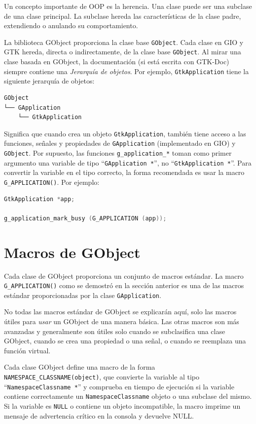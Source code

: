 Un concepto importante de OOP es la herencia. Una clase puede ser una subclase de una clase principal. La subclase hereda las características de la clase padre, extendiendo o anulando su comportamiento.

La biblioteca GObject proporciona la clase base \lstinline{GObject}. Cada clase en GIO y GTK hereda, directa o indirectamente, de la clase base \lstinline{GObject}. Al mirar una clase basada en GObject, la documentación (si está escrita con GTK-Doc) siempre contiene una \emph{Jerarquía de objetos}. Por ejemplo, \lstinline{GtkApplication} tiene la siguiente jerarquía de objetos:

\begin{verbatim}
GObject
└── GApplication
    └── GtkApplication
\end{verbatim}

Significa que cuando crea un objeto \lstinline{GtkApplication}, también tiene acceso a las funciones, señales y propiedades de \lstinline{GApplication} (implementado en GIO) y \lstinline{GObject}. Por supuesto, las funciones \lstinline{g_application_*} toman como primer argumento una variable de tipo ``\lstinline{GApplication *}'', no ``\lstinline{GtkApplication *}''. Para convertir la variable en el tipo correcto, la forma recomendada es usar la macro \lstinline{G_APPLICATION()}. Por ejemplo:

\begin{lstlisting}[language=C]
GtkApplication *app;

g_application_mark_busy (G_APPLICATION (app));
\end{lstlisting}

\section{Macros de GObject}

Cada clase de GObject proporciona un conjunto de macros estándar. La macro \lstinline{G_APPLICATION()} como se demostró en la sección anterior es una de las macros estándar proporcionadas por la clase \lstinline{GApplication}.

No todas las macros estándar de GObject se explicarán aquí, solo las macros útiles para \emph{usar} un GObject de una manera básica. Las otras macros son más avanzadas y generalmente son útiles solo cuando se subclasifica una clase GObject, cuando se crea una propiedad o una señal, o cuando se reemplaza una función virtual.

Cada clase GObject define una macro de la forma \lstinline{NAMESPACE_CLASSNAME(object)}, que convierte la variable al tipo ``\lstinline{NamespaceClassname *}'' y comprueba en tiempo de ejecución si la variable contiene correctamente un \lstinline{NamespaceClassname} objeto o una subclase del mismo. Si la variable es \lstinline{NULL} o contiene un objeto incompatible, la macro imprime un mensaje de advertencia crítico en la consola y devuelve NULL.

